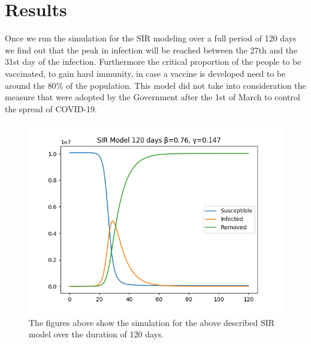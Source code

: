 \documentclass[]{article}
\begin{document}
\section{Results}
Once we run the simulation for the SIR modeling over a full period of 120 days we find out that the peak in infection will be reached between the 27th and the 31st day of the infection. Furthermore the critical proportion of the people to be vaccinated, to gain hard immunity, in case a vaccine is developed need to be around the $80\%$ of the population. This model did not take into consideration the measure that were adopted by the Government after the 1st of March to control the spread of COVID-19.
\begin{figure}[h]
	\includegraphics[scale=.5]{../Fig3.png}
	\caption{The figures above show the simulation for the above described SIR model over the duration of 120 days.}
\end{figure}


\end{document}
